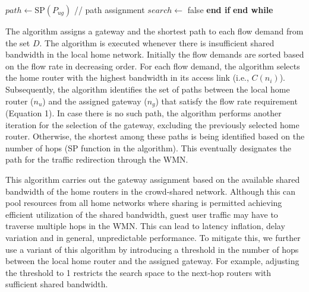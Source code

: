 \begin{algorithm}[htbp]
\begin{algorithmic}
    \vspace{0.7mm}
    \STATE \hspace{1.2cm} $path \leftarrow \mathrm{SP} (P_{ug})$ \hspace{0.3cm} // path assignment
    \vspace{0.7mm}
    \STATE \hspace{1.2cm} $search \leftarrow$ false
    \vspace{0.7mm}
    \STATE \hspace{0.8cm} \textbf{end if}
    \vspace{0.7mm}
    \STATE \hspace{0.4cm} \textbf{end while}
    \vspace{0.7mm}
    \ENDFOR
  \end{algorithmic}
\end{algorithm}

The algorithm assigns a gateway and the shortest path to each flow demand from the set $D$. The algorithm is executed whenever there is insufficient shared bandwidth in the local home network. Initially the flow demands are sorted based on the flow rate in decreasing order. For each flow demand, the algorithm selects the home router with the highest bandwidth in its access link (i.e., $C(n_i)$). Subsequently, the algorithm identifies the set of paths between the local home router ($n_u$) and the assigned gateway ($n_g$) that satisfy the flow rate requirement (Equation 1). In case there is no such path, the algorithm performs another iteration for the selection of the gateway, excluding the previously selected home router. Otherwise, the shortest among these paths is being identified based on the number of hops (SP function in the algorithm). This eventually designates the path for the traffic redirection through the WMN.

This algorithm carries out the gateway assignment based on the available shared bandwidth of the home routers in the crowd-shared network. Although this can pool resources from all home networks where sharing is permitted achieving efficient utilization of the shared bandwidth, guest user traffic may have to traverse multiple hops in the WMN. This can lead to latency inflation, delay variation and in general, unpredictable performance. To mitigate this, we further use a variant of this algorithm by introducing a threshold in the number of hops between the local home router and the assigned gateway. For example, adjusting the threshold to 1 restricts the search space to the next-hop routers with sufficient shared bandwidth.



